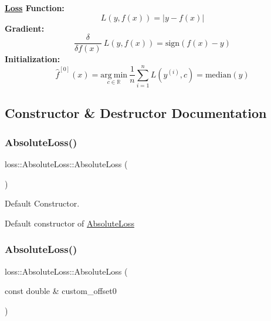 {\bfseries \hyperlink{classloss_1_1_loss}{Loss} Function\+:} \[ L(y, f(x)) = \left| y - f(x) \right| \] {\bfseries Gradient\+:} \[ \frac{\delta}{\delta f(x)}\ L(y, f(x)) = \mathrm{sign}\left( f(x) - y \right) \] {\bfseries Initialization\+:} \[ \hat{f}^{[0]}(x) = \underset{c\in\mathbb{R}}{\mathrm{arg~min}}\ \frac{1}{n}\sum\limits_{i=1}^n L\left(y^{(i)}, c\right) = \mathrm{median}(y) \] 

\subsection{Constructor \& Destructor Documentation}
\mbox{\label{classloss_1_1_absolute_loss_a4b1416147d0573079f9d652097c1ab81}} 
\subsubsection{\texorpdfstring{Absolute\+Loss()}{AbsoluteLoss()}\hspace{0.1cm}{\footnotesize\ttfamily [1/2]}}
{\footnotesize\ttfamily loss\+::\+Absolute\+Loss\+::\+Absolute\+Loss (\begin{DoxyParamCaption}{ }\end{DoxyParamCaption})}



Default Constructor. 

Default constructor of {\ttfamily \hyperlink{classloss_1_1_absolute_loss}{Absolute\+Loss}} \mbox{\label{classloss_1_1_absolute_loss_a3e056fbde0b63527bb9aadb0a4a8547a}} 
\subsubsection{\texorpdfstring{Absolute\+Loss()}{AbsoluteLoss()}\hspace{0.1cm}{\footnotesize\ttfamily [2/2]}}
{\footnotesize\ttfamily loss\+::\+Absolute\+Loss\+::\+Absolute\+Loss (\begin{DoxyParamCaption}\item[{const double \&}]{custom\+\_\+offset0 }\end{DoxyParamCaption})}



